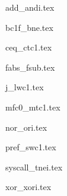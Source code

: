 

{add_andi.tex}

{bc1f_bne.tex}

{ceq_ctc1.tex}

{fabs_fsub.tex}

{j_lwc1.tex}

{mfc0_mtc1.tex}

{nor_ori.tex}

{pref_swc1.tex}

{syscall_tnei.tex}

{xor_xori.tex}